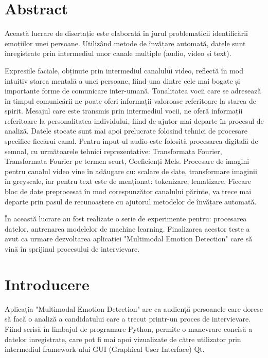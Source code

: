 \documentclass[a4paper, 12pt]{report}
\begin{document}
	
	
	
	\newpage
	\tableofcontents
	\newpage
	\section{Abstract}	
	Această lucrare de disertație este elaborată în jurul problematicii identificării emoțiilor unei persoane. Utilizând metode de învățare automată, datele sunt înregistrate prin intermediul unor canale multiple (audio, video și text). 
	
	Expresiile faciale, obținute prin intermediul canalului video, reflectă în mod intuitiv starea mentală a unei persoane, fiind una dintre cele mai bogate și importante forme de comunicare inter-umană. Tonalitatea vocii care se adresează în timpul comunicării ne poate oferi informații valoroase referitoare la starea de spirit. Mesajul care este transmis prin intermediul vocii, ne oferă informații referitoare la personalitatea individului, fiind de ajutor mai departe în procesul de analiză.
	Datele stocate sunt mai apoi prelucrate folosind tehnici de procesare specifice fiecărui canal. Pentru input-ul audio este folosită procesarea digitală de semnal, cu următoarele tehnici reprezentative: Transformata Fourier, Transformata Fourier pe termen scurt, Coeficienți Mels. Procesare de imagini pentru canalul video vine în adăugare cu: scalare de date, transformare imaginii în greyscale, iar pentru text este de menționat: tokenizare, lematizare. Fiecare bloc de date preprocesat în mod corespunzător canalului părinte, va trece mai departe prin pasul de recunoaștere cu ajutorul metodelor de învățare automată.
	
	
	În această lucrare au fost realizate o serie de experimente pentru: procesarea datelor, antrenarea modelelor de machine learning. Finalizarea acestor teste a avut ca urmare dezvoltarea aplicației "Multimodal Emotion Detection" care să vină în sprijinul procesului de intervievare.
	\clearpage
	
	\section{Introducere}
	Aplicația "Multimodal Emotion Detection" are ca audiență persoanele care doresc să facă o analiză a candidatului care a trecut printr-un proces de intervievare. Fiind scrisă în limbajul de programare Python, permite o manevrare concisă a datelor inregistrate, care pot fi mai apoi vizualizate de către utilizator prin intermediul framework-ului GUI (Graphical User Interface) Qt.
	
\end{document}
